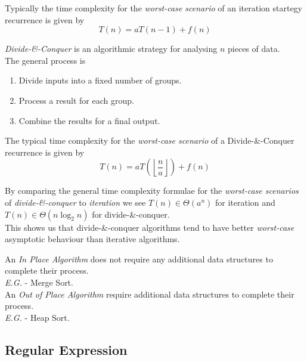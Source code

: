 \documentclass[11pt,a4paper]{article}
\begin{document}
Typically the time complexity for the \textit{worst-case scenario} of an iteration startegy recurrence is given by
$$T(n)=aT(n-1)+f(n)$$

\textit{Divide-\&-Conquer} is an algorithmic strategy for analysing $n$ pieces of data.\\
The general process is
\begin{enumerate}[label=\roman*)]
  \item Divide inputs into a fixed number of groups.
  \item Process a result for each group.
  \item Combine the results for a final output.
\end{enumerate}

The typical time complexity for the \textit{worst-case scenario} of a Divide-\&-Conquer recurrence is given by
$$T(n)=aT\left(\left\lfloor\frac{n}{a}\right\rfloor\right)+f(n)$$

By comparing the general time complexity formulae for the \textit{worst-case scenarios} of \textit{divide-\&-conquer} to \textit{iteration} we see $T(n)\in\Theta(a^n)$ for iteration and $T(n)\in\Theta(n\log_2n)$ for divide-\&-conquer.\\
This shows us that divide-\&-conquer algorithms tend to have better \textit{worst-case} asymptotic behaviour than iterative algorithms.

An \textit{In Place Algorithm} does not require any additional data structures to complete their process.\\
\textit{E.G.} - Merge Sort.\\

An \textit{Out of Place Algorithm} require additional data structures to complete their process.\\
\textit{E.G.} - Heap Sort.

\newpage
\subsection{Regular Expression}
\end{document}

